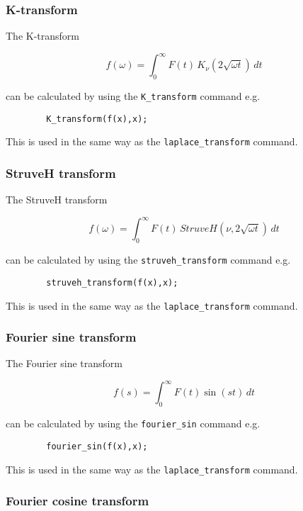 \subsubsection{K-transform}

The K-transform

\[
f(\omega) = \int_{0}^{\infty} F(t) \,K_{\nu}(2\sqrt{\omega t}) \,dt
\]

can be calculated by using the \verb+K_transform+ command e.g.

\begin{verbatim}
        K_transform(f(x),x);
\end{verbatim}

This is used in the same way as the \verb+laplace_transform+ command.

\subsubsection{StruveH transform}

The StruveH transform

\[
f(\omega) = \int_{0}^{\infty} F(t) \,StruveH(\nu,2\sqrt{\omega t}) \,dt
\]

can be calculated by using the \verb+struveh_transform+ command e.g.

\begin{verbatim}
        struveh_transform(f(x),x);
\end{verbatim}

This is used in the same way as the \verb+laplace_transform+ command.

\subsubsection{Fourier sine transform}

The Fourier sine transform

\[
f(s) = \int_{0}^{\infty} F(t) \sin(st) \,dt
\]

can be calculated by using the \verb+fourier_sin+ command e.g.
\begin{verbatim}
        fourier_sin(f(x),x);
\end{verbatim}

This is used in the same way as the \verb+laplace_transform+ command.

\subsubsection{Fourier cosine transform}

